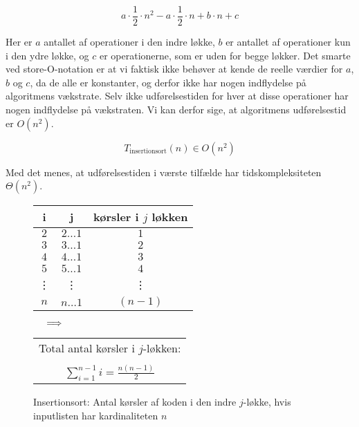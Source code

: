 $$a \cdot \frac{1}{2} \cdot n^2 - a \cdot \frac{1}{2} \cdot n + b \cdot n + c$$

Her er $a$ antallet af operationer i den indre løkke, $b$ er antallet af operationer kun i den ydre løkke, og $c$ er operationerne, som er uden for begge løkker. Det smarte ved store-O-notation er at vi faktisk ikke behøver at kende de reelle værdier for $a$, $b$ og $c$, da de alle er konstanter, og derfor ikke har nogen indflydelse på algoritmens vækstrate. Selv ikke udførelsestiden for hver at disse operationer har nogen indflydelse på vækstraten. Vi kan derfor sige, at algoritmens udførelsestid er $O(n^2)$.

$$T_{\text{insertionsort}}(n) \in O(n^2)$$

Med det menes, at udførelsestiden i værste tilfælde har tidskompleksiteten $\Theta (n^2)$.


\begin{figure}[b]
	\begin{center}
		\padtable
		\begin{tabular}{ c|c|c }
			i & j & kørsler i $j$ løkken\\
			\hline
			$2$ & $2 \dots 1$ & $1$\\
			$3$ & $3 \dots 1$ & $2$\\
			$4$ & $4 \dots 1$ & $3$\\
			$5$ & $5 \dots 1$ & $4$\\
			\vdots & \vdots & \vdots\\
			$n$ & $n \dots 1$ & $(n-1)$\\
		\end{tabular}
		$\:\:\:\:\:\: \Longrightarrow \:\:\:\:\:\: $	
		\begin{tabular}{c}
			Total antal kørsler i $j$-løkken:\\
			\vspace{-4mm}
			\\
			$\displaystyle\sum_{i=1}^{n-1}i=\frac{n(n-1)}{2}$
		\end{tabular}
	\end{center}
	\caption{Insertionsort: Antal kørsler af koden i den indre $j$-løkke, hvis inputlisten har kardinaliteten $n$}
	\label{fig:Insertionsort Operationer i løkker}
\end{figure}


